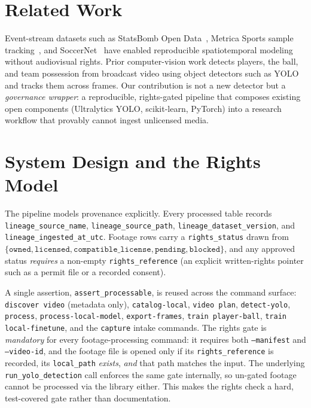 \documentclass[11pt]{article}
\begin{document}
\section{Related Work}
Event-stream datasets such as StatsBomb Open Data~\cite{statsbomb}, Metrica
Sports sample tracking~\cite{metrica}, and SoccerNet~\cite{soccernet} have
enabled reproducible spatiotemporal modeling without audiovisual rights. Prior
computer-vision work detects players, the ball, and team possession from
broadcast video using object detectors such as YOLO~\cite{redmon2016yolo,
ultralytics} and tracks them across frames. Our contribution is not a new
detector but a \emph{governance wrapper}: a reproducible, rights-gated pipeline
that composes existing open components (Ultralytics YOLO, scikit-learn,
PyTorch) into a research workflow that provably cannot ingest unlicensed media.

\section{System Design and the Rights Model}
The pipeline models provenance explicitly. Every processed table records
\texttt{lineage\_source\_name}, \texttt{lineage\_source\_path},
\texttt{lineage\_dataset\_version}, and \texttt{lineage\_ingested\_at\_utc}.
Footage rows carry a \texttt{rights\_status} drawn from
$\{\texttt{owned}, \texttt{licensed}, \texttt{compatible\_license},
\texttt{pending}, \texttt{blocked}\}$, and any approved status \emph{requires} a
non-empty \texttt{rights\_reference} (an explicit written-rights pointer such as
a permit file or a recorded consent). 

A single assertion, \texttt{assert\_processable}, is reused across the
command surface: \texttt{discover video} (metadata only), \texttt{catalog-local},
\texttt{video plan}, \texttt{detect-yolo}, \texttt{process},
\texttt{process-local-model}, \texttt{export-frames},
\texttt{train player-ball}, \texttt{train local-finetune}, and the
\texttt{capture} intake commands. The rights gate is \emph{mandatory} for every
 footage-processing command: it requires both \texttt{--manifest} and
 \texttt{--video-id}, and the footage file is opened only if its
 \texttt{rights\_reference} is recorded, its \texttt{local\_path} \emph{exists},
 \emph{and} that path matches the input. The underlying \texttt{run\_yolo\_detection}
 call enforces the same gate internally, so un-gated footage cannot be processed
 via the library either. This makes the rights check a hard, test-covered gate rather
 than documentation.
\end{document}

